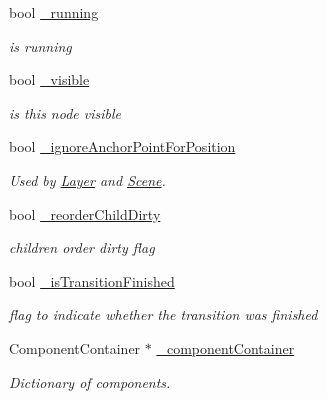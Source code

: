 \begin{DoxyCompactItemize}
bool \hyperlink{classNode_aa26daeae52daea23a70c899c5361fff2}{\+\_\+running}
\begin{DoxyCompactList}\small\item\em is running \end{DoxyCompactList}\item 
\mbox{\label{classNode_a39fcead06157af8c4e6d4ca59596e52c}} 
bool \hyperlink{classNode_a39fcead06157af8c4e6d4ca59596e52c}{\+\_\+visible}
\begin{DoxyCompactList}\small\item\em is this node visible \end{DoxyCompactList}\item 
bool \hyperlink{classNode_aef122b1552bec154a2a8923641b4e0f2}{\+\_\+ignore\+Anchor\+Point\+For\+Position}
\begin{DoxyCompactList}\small\item\em Used by \hyperlink{classLayer}{Layer} and \hyperlink{classScene}{Scene}. \end{DoxyCompactList}\item 
\mbox{\label{classNode_a1246c0fc5cf2f9afcc82a4af90a143ba}} 
bool \hyperlink{classNode_a1246c0fc5cf2f9afcc82a4af90a143ba}{\+\_\+reorder\+Child\+Dirty}
\begin{DoxyCompactList}\small\item\em children order dirty flag \end{DoxyCompactList}\item 
\mbox{\label{classNode_aec1c7e6bc6a34a3364c9c741428622ff}} 
bool \hyperlink{classNode_aec1c7e6bc6a34a3364c9c741428622ff}{\+\_\+is\+Transition\+Finished}
\begin{DoxyCompactList}\small\item\em flag to indicate whether the transition was finished \end{DoxyCompactList}\item 
\mbox{\label{classNode_aedd5a831c6a09e65e09a00855fe4676d}} 
Component\+Container $\ast$ \hyperlink{classNode_aedd5a831c6a09e65e09a00855fe4676d}{\+\_\+component\+Container}
\begin{DoxyCompactList}\small\item\em Dictionary of components. \end{DoxyCompactList}\item 
\mbox{\label{classNode_a669e03f00645d5bcb839db8deaa4d85a}} 

\end{DoxyCompactItemize}
